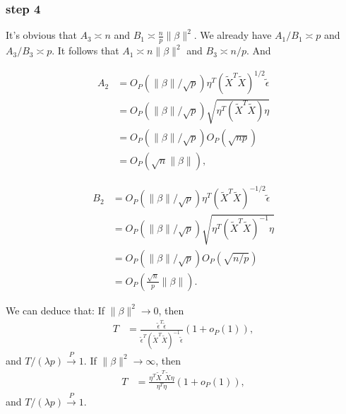 \documentclass[review]{elsarticle}
\theoremstyle{plain}
\theoremstyle{definition}
\theoremstyle{remark}
\begin{document}
\subsubsection{step 4}
It's obvious that $A_3\asymp n$ and $B_1\asymp \frac{n}{p}\|\beta\|^2$. We already have $A_1/B_1\asymp p$ and $A_3/B_3\asymp p$. It follows that $A_1\asymp n\|\beta\|^2$ and $B_3\asymp n/p$. And

\begin{equation}
    \begin{aligned}
        A_2&=O_P(\|\beta\|/{\sqrt{p}})\eta^T {(\tilde{X}^T\tilde{X})}^{1/2}\tilde{\epsilon}\\
        &=O_P(\|\beta\|/\sqrt{p})\sqrt{\eta^T{(\tilde{X}^T\tilde{X})}\eta}\\
        &=O_P(\|\beta\|/\sqrt{p})O_P(\sqrt{np})\\
        &=O_P(\sqrt{n}\|\beta\|),
    \end{aligned}
\end{equation}

\begin{equation}
    \begin{aligned}
        B_2&=O_P(\|\beta\|/{\sqrt{p}})\eta^T {(\tilde{X}^T\tilde{X})}^{-1/2}\tilde{\epsilon}\\
        &=O_P(\|\beta\|/\sqrt{p})\sqrt{\eta^T{(\tilde{X}^T\tilde{X})}^{-1}\eta}\\
        &=O_P(\|\beta\|/\sqrt{p})O_P(\sqrt{n/p})\\
        &=O_P(\frac{\sqrt{n}}{p}\|\beta\|).
    \end{aligned}
\end{equation}



We can deduce that:
If $\|\beta\|^2\to 0$, then
\begin{equation}
    \begin{aligned}
        T&=
        \frac{\tilde{\epsilon}^T\tilde{\epsilon}
    }{\tilde{\epsilon}^T{(\tilde{X}^T\tilde{X})}^{-1}\tilde{\epsilon}
        }(1+o_P(1)),
    \end{aligned}
\end{equation}
and $T/(\lambda p)\xrightarrow{P} 1$.
If $\|\beta\|^2\to \infty$, then
\begin{equation}
    \begin{aligned}
        T&=
        \frac{\eta^T \tilde{X}^T\tilde{X} \eta    
        }{\eta^T\eta}(1+o_P(1)),
    \end{aligned}
\end{equation}
and $T/(\lambda p)\xrightarrow{P} 1$.
\end{document}
